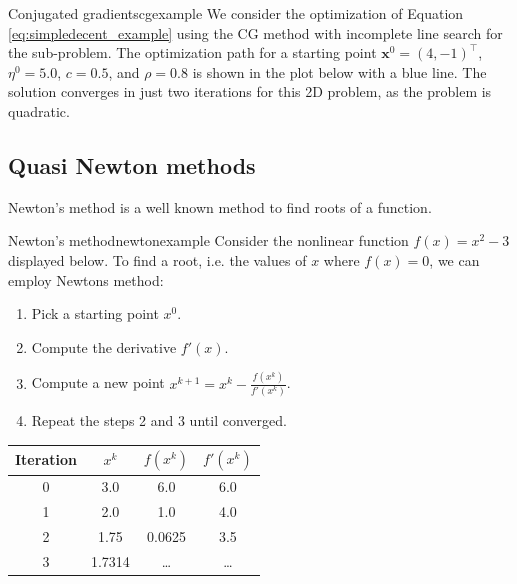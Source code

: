 \begin{example}{Conjugated gradients}{cgexample}
    We consider the optimization of Equation \eqref{eq:simpledecent_example} using the CG method with incomplete line search for the sub-problem. The optimization path for a starting point $\mathbf{x}^0= (4, -1)^\top$, $\eta^0=5.0$, $c=0.5$, and $\rho=0.8$ is shown in the plot below with a blue line. The solution converges in just two iterations for this 2D problem, as the problem is quadratic.
    \begin{center}
        
    \end{center}   
\end{example}

\subsection{Quasi Newton methods}
Newton's method is a well known method to find roots of a function. 

\begin{example}{Newton's method}{newtonexample}
    Consider the nonlinear function $f(x) = x^2 - 3$ displayed below. To find a root, i.e. the values of $x$ where $f(x)=0$, we can employ Newtons method: 
    \begin{enumerate}
        \item Pick a starting point $x^0$.
        \item Compute the derivative $f'(x)$.
        \item Compute a new point $x^{k+1} = x^k - \frac{f(x^k)}{f'(x^k)}$.
        \item Repeat the steps 2 and 3 until converged.
    \end{enumerate}
    
    
    \begin{center}    
        \begin{tabular}{cccc}
    
             Iteration  & $x^k$     & $f(x^k)$  & $f'(x^k)$\\
             \hline
             0          & 3.0       & 6.0       & 6.0\\
             1          & 2.0       & 1.0       & 4.0\\
             2          & 1.75      & 0.0625    & 3.5\\
             3          & 1.7314    & \dots     & \dots\\
        \end{tabular}
    \end{center}
\end{example}


